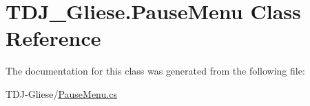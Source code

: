 \hypertarget{class_t_d_j___gliese_1_1_pause_menu}{}\section{T\+D\+J\+\_\+\+Gliese.\+Pause\+Menu Class Reference}
\label{class_t_d_j___gliese_1_1_pause_menu}


The documentation for this class was generated from the following file\+:\begin{DoxyCompactItemize}
\item 
T\+D\+J-\/\+Gliese/\hyperlink{_pause_menu_8cs}{Pause\+Menu.\+cs}\end{DoxyCompactItemize}
